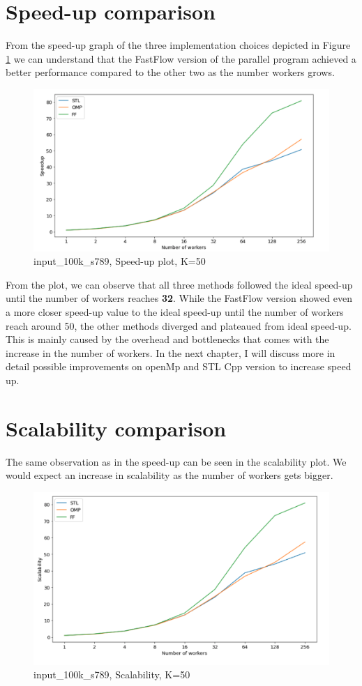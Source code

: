 \documentclass[12pt,a4paper]{report}
\begin{document}
\section{Speed-up comparison}
From the speed-up graph of the three implementation choices depicted in Figure \ref{speedup-main} we can understand that the FastFlow version of the parallel program achieved a better performance compared to the other two as the number workers grows.
\begin{figure}[H]
    \centering
    \includegraphics[width=\textwidth]{images/main-speedup.png}
    \caption{input\_100k\_s789, Speed-up plot, K=50}
    \label{speedup-main}
\end{figure}
 From the plot, we can observe that all three methods followed the ideal speed-up until the number of workers reaches \textbf{32}. While the FastFlow version showed even a more closer speed-up value to the ideal speed-up until the number of workers reach around 50, the other methods diverged and plateaued from ideal speed-up. This is mainly caused by the overhead and bottlenecks that comes with the increase in the number of workers. In the next chapter, I will discuss more in detail possible improvements on openMp and STL Cpp version to increase speed up. 
\section{Scalability comparison}
The same observation as in the speed-up can be seen in the scalability plot. We would expect an increase in scalability as the number of workers gets bigger. 
\begin{figure}[H]
    \centering
    \includegraphics[width=12cm]{images/main-scalability.png}
    \caption{input\_100k\_s789, Scalability, K=50}
    \label{scalability-main}
\end{figure}
 
\end{document}
